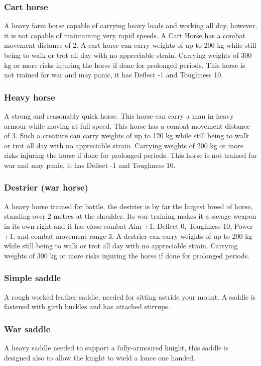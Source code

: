 \documentclass[a4paper,11pt,oneside]{book}
\begin{document}
\subsubsection*{Cart horse}
A heavy farm horse capable of carrying heavy loads and working all day, however, it is not capable of maintaining very rapid speeds. A Cart Horse has a combat movement distance of 2. A cart horse can carry weights of up to 200 kg while still being to walk or trot all day with no appreciable strain. Carrying weights of 300 kg or more risks injuring the horse if done for prolonged periods. This horse is not trained for war and may panic, it has Deflect -1 and Toughness 10.

\subsubsection*{Heavy horse}
A strong and reasonably quick horse. This horse can carry a man in heavy armour while moving at full speed. This horse has a combat movement distance of 3. Such a creature can carry weights of up to 120 kg while still being to walk or trot all day with no appreciable strain. Carrying weights of 200 kg or more risks injuring the horse if done for prolonged periods. This horse is not trained for war and may panic, it has Deflect -1 and Toughness 10.

\subsubsection*{Destrier (war horse)}
A heavy horse trained for battle, the destrier is by far the largest breed of horse, standing over 2 metres at the shoulder. Its war training makes it a savage weapon in its own right and it has close-combat Aim +1, Deflect 0, Toughness 10, Power +1, and combat movement range 3. A destrier can carry weights of up to 200 kg while still being to walk or trot all day with no appreciable strain. Carrying weights of 300 kg or more risks injuring the horse if done for prolonged periods.

\subsubsection*{Simple saddle}
A rough worked leather saddle, needed for sitting astride your mount. A saddle is fastened with girth buckles and has attached stirrups.

\subsubsection*{War saddle}
A heavy saddle needed to support a fully-armoured knight, this saddle is designed also to allow the knight to wield a lance one handed.
\end{document}
